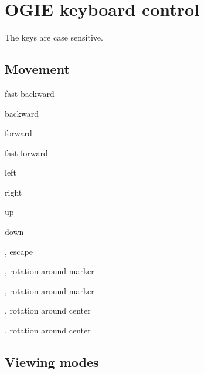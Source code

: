 \newenvironment{hkkeys}
    {\begin{list}{}
        {
        \setlength{\leftmargin}{9em}
        \setlength{\labelwidth}{8em}
        \setlength{\labelsep}{2em}
        \setlength{\parsep}{0em}
        \setlength{\itemsep}{0.5ex}
        }
    }
    {\end{list}}


\section{OGIE keyboard control}
\label{keys}

The keys are case sensitive.

\subsection*{Movement}

\begin{hkkeys}
\item[\keys{a}]        fast backward
\item[\keys{s}]        backward
\item[\keys{g}]        forward
\item[\keys{space}]    fast forward
\item[\keys{d}]        left
\item[\keys{f}]        right
\item[\keys{t}]        up
\item[\keys{z}]        down
\item[\keys{q}, \keys{esc}]    escape
\item[\keys{\arrowkeyleft}, \keys{\arrowkeyright}] rotation around marker
\item[\keys{\arrowkeyup}, \keys{\arrowkeydown}] rotation around marker
\item[\keys{\shift+\arrowkeyleft}, \keys{\shift+\arrowkeyright}]
            rotation around center
\item[\keys{\shift+\arrowkeyup}, \keys{\shift+\arrowkeydown}]
            rotation around center

\end{hkkeys}



\subsection*{Viewing modes}

